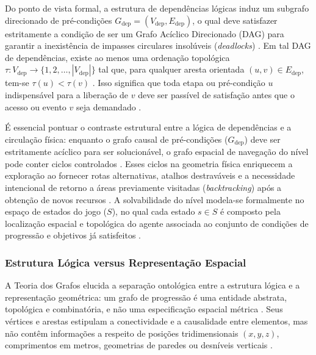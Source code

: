 Do ponto de vista formal, a estrutura de dependências lógicas induz um subgrafo direcionado de pré-condições $G_{\text{dep}} = (V_{\text{dep}}, E_{\text{dep}})$, o qual deve satisfazer estritamente a condição de ser um Grafo Acíclico Direcionado (DAG) para garantir a inexistência de impasses circulares insolúveis (\textit{deadlocks}) \cite{cormen2009introduction, dormans2010, linden2014dungeons}. Em tal DAG de dependências, existe ao menos uma ordenação topológica $\tau: V_{\text{dep}} \to \{1, 2, \dots, |V_{\text{dep}}|\}$ tal que, para qualquer aresta orientada $(u, v) \in E_{\text{dep}}$, tem-se $\tau(u) < \tau(v)$ \cite{cormen2009introduction}. Isso significa que toda etapa ou pré-condição $u$ indispensável para a liberação de $v$ deve ser passível de satisfação antes que o acesso ou evento $v$ seja demandado \cite{dormans2010, linden2013designing}.

É essencial pontuar o contraste estrutural entre a lógica de dependências e a circulação física: enquanto o grafo causal de pré-condições ($G_{\text{dep}}$) deve ser estritamente acíclico para ser solucionável, o grafo espacial de navegação do nível pode conter ciclos controlados \cite{dormans2010, linden2014dungeons}. Esses ciclos na geometria física enriquecem a exploração ao fornecer rotas alternativas, atalhos destraváveis e a necessidade intencional de retorno a áreas previamente visitadas (\textit{backtracking}) após a obtenção de novos recursos \cite{dormans2010, linden2013designing, linden2014dungeons}. A solvabilidade do nível modela-se formalmente no espaço de estados do jogo ($S$), no qual cada estado $s \in S$ é composto pela localização espacial e topológica do agente associada ao conjunto de condições de progressão e objetivos já satisfeitos \cite{dormans2010, linden2014dungeons}.

\subsubsection{Estrutura Lógica versus Representação Espacial}
\label{sec:logica_vs_espacial}

A Teoria dos Grafos elucida a separação ontológica entre a estrutura lógica e a representação geométrica: um grafo de progressão é uma entidade abstrata, topológica e combinatória, e não uma especificação espacial métrica \cite{dormans2010, summerville2018procedural}. Seus vértices e arestas estipulam a conectividade e a causalidade entre elementos, mas não contêm informações a respeito de posições tridimensionais $(x, y, z)$, comprimentos em metros, geometrias de paredes ou desníveis verticais \cite{dormans2010, linden2013designing, linden2014dungeons}.

